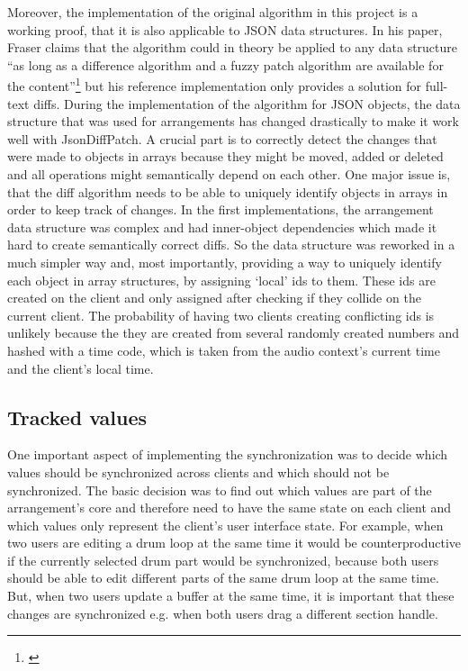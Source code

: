 Moreover, the implementation of the original algorithm in this project is a working proof, that it is also applicable to JSON data structures. In his paper, Fraser claims that the algorithm could in theory be applied to any data structure ``as long as a difference algorithm and a fuzzy patch algorithm are available for the content''\footnote{\cite[p. 5]{fraser2009differential}} but his reference implementation only provides a solution for full-text diffs. During the implementation of the algorithm for JSON objects, the data structure that was used for arrangements has changed drastically to make it work well with JsonDiffPatch. A crucial part is to correctly detect the changes that were made to objects in arrays because they might be moved, added or deleted and all operations might semantically depend on each other. One major issue is, that the diff algorithm needs to be able to uniquely identify objects in arrays in order to keep track of changes. In the first implementations, the arrangement data structure was complex and had inner-object dependencies which made it hard to create semantically correct diffs. So the data structure was reworked in a much simpler way and, most importantly, providing a way to uniquely identify each object in array structures, by assigning `local' ids to them. These ids are created on the client and only assigned after checking if they collide on the current client. The probability of having two clients creating conflicting ids is unlikely because the they are created from several randomly created numbers and hashed with a time code, which is taken from the audio context's current time and the client's local time.

\subsection{Tracked values}
\label{sub:sync-tracked-values}

One important aspect of implementing the synchronization was to decide which values should be synchronized across clients and which should not be synchronized. The basic decision was to find out which values are part of the arrangement's core and therefore need to have the same state on each client and which values only represent the client's user interface state. For example, when two users are editing a drum loop at the same time it would be counterproductive if the currently selected drum part would be synchronized, because both users should be able to edit different parts of the same drum loop at the same time. But, when two users update a buffer at the same time, it is important that these changes are synchronized e.g. when both users drag a different section handle.


